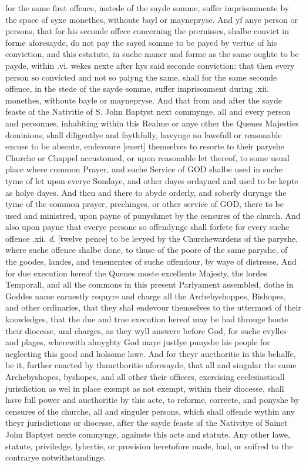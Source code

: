for the same first offence, instede of the sayde somme, suffer imprisonmente
by the space of syxe monethes, withoute bayl or maynepryse. And yf anye
person or persons, that for his seconde offece concerning the prernisses,
shalbe convict in forme aforesayde, do not pay the sayed somme to be
payed by vertue of his conviction, and this estatute, in suche maner
and forme as the same oughte to be payde, within .vi. wekes nexte after
hys said seconde conviction: that then every person so convicted and
not so paiyng the same, shall for the same seconde offence, in the stede
of the sayde somme, suffer imprisonment during .xii. monethes, withoute
bayle or maynepryse. And that from and after the sayde feaste of the
Nativitie of S. John Baptyst next commynge, all and every person and
personnes, inhabiting within this Realme or anye other the Quenes Majesties
dominions, shall diligentlye and faythfully, havynge no lawefull or
reasonable excuse to be absente, endevoure [exert]
themselves to resorte to their paryshe Churche or Chappel accustomed,
or upon reasonable let thereof, to some usual place where common Prayer,
and suche Service of GOD shalbe used in suche tyme of let upon everye
Sondaye, and other dayes ordayned and used to be kepte as holye dayes.
And then and there to abyde orderly, and soberly durynge the tyme of
the common prayer, prechinges, or other service of GOD, there to be
used and ministred, upon payne of punyshmet by the censures of the church.
And also upon payne that everye persone so offendynge shall forfete
for every suche offence .xii. \emph{d}. [twelve
pence] to be levyed by the Churchewardens of the paryshe, where
suche offence shalbe done, to thuse of the poore of the same paryshe,
of the goodes, landes, and tenementes of suche offendour, by waye of
distresse. And for due execution hereof the Quenes moste excellente
Majesty, the lordes Temporall, and all the commons in this present Parlyament
assembled, dothe in Goddes name earnestly requyre and charge all the
Archebyshoppes, Bishopes, and other ordinaries, that they shal endevour
themselves to the uttermost of their knowledges, that the due and true
execution hereof may be had througe houte their diocesse, and charges,
as they wyll answere before God, for suche evylles and plages, wherewith
almyghty God maye justlye punyshe his people for neglecting this good
and holsome lawe. And for theyr aucthoritie in this behalfe, be it,
further enacted by thaucthoritie aforesayde, that all and singular the
same Archebyshopes, byshopes, and all other their officers, exercising
ecclesiasticall jurisdiction as wel in place exempt as not exempt, within
their diocesse, shall have full power and aucthoritie by this acte,
to reforme, correcte, and ponyshe by censures of the churche, all and
singuler persons, which shall offende wythin any theyr jurisdictions
or diocesse, after the sayde feaste of the Nativitye of Sainct John
Baptyst nexte commynge, againste this acte and statute. Any other lawe,
statute, priviledge, lybertie, or provision heretofore made, had, or
suifred to the contrarye notwithstandinge.

